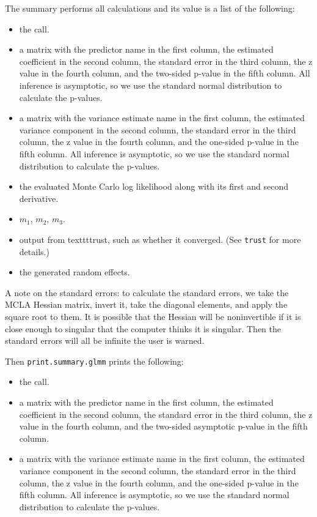 \documentclass{article}
\begin{document}
The summary performs all calculations and its value is a list of the following:
\begin{itemize}
\item the call.
\item a matrix with the predictor name in the first column, the estimated coefficient in the second column, the standard error in the third column, the z value in the fourth column, and the two-sided p-value  in the fifth column. All inference is asymptotic, so we use the standard normal distribution to calculate the p-values.
\item a matrix with the variance estimate name  in the first column, the estimated variance component in the second column, the standard error in the third column, the z value in the fourth column, and the one-sided p-value  in the fifth column. All inference is asymptotic, so we use the standard normal distribution to calculate the p-values.
\item the evaluated Monte Carlo log likelihood along with its first and second derivative.
\item $m_1$, $m_2$, $m_3$.
\item output from texttt{trust}, such as whether it converged. (See \texttt{trust} for more details.)
\item the generated random effects.
\end{itemize}

A note on the standard errors: to calculate the standard errors, we take the MCLA Hessian matrix, invert it, take the diagonal elements, and apply the square root to them. It is possible that the Hessian will be noninvertible if it is close enough to singular that the computer thinks it is singular.  Then the standard errors will all be infinite  the user is warned.

Then \texttt{print.summary.glmm}  prints the following:
\begin{itemize}
\item the call.
\item a matrix with the predictor name in the first column, the estimated coefficient in the second column, the standard error in the third column, the z value in the fourth column, and the two-sided asymptotic p-value  in the fifth column. 
\item a matrix with the variance estimate name  in the first column, the estimated variance component in the second column, the standard error in the third column, the z value in the fourth column, and the one-sided p-value  in the fifth column. All inference is asymptotic, so we use the standard normal distribution to calculate the p-values.
\end{itemize}
\end{document}
